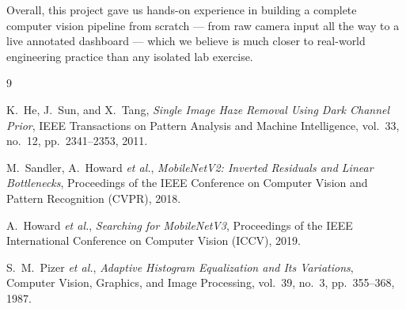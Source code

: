 \documentclass[12pt, a4paper]{article}
\begin{document}
Overall, this project gave us hands-on experience in building a complete
computer vision pipeline from scratch — from raw camera input all the way to a
live annotated dashboard — which we believe is much closer to real-world
engineering practice than any isolated lab exercise.

\newpage
\begin{thebibliography}{9}

K.~He, J.~Sun, and X.~Tang,
\textit{Single Image Haze Removal Using Dark Channel Prior},
IEEE Transactions on Pattern Analysis and Machine Intelligence,
vol.~33, no.~12, pp.~2341--2353, 2011.

M.~Sandler, A.~Howard \textit{et al.},
\textit{MobileNetV2: Inverted Residuals and Linear Bottlenecks},
Proceedings of the IEEE Conference on Computer Vision and Pattern Recognition
(CVPR), 2018.

A.~Howard \textit{et al.},
\textit{Searching for MobileNetV3},
Proceedings of the IEEE International Conference on Computer Vision (ICCV), 2019.

S.~M.~Pizer \textit{et al.},
\textit{Adaptive Histogram Equalization and Its Variations},
Computer Vision, Graphics, and Image Processing,
vol.~39, no.~3, pp.~355--368, 1987.

\end{thebibliography}
\end{document}
